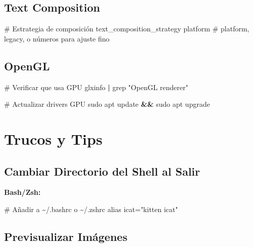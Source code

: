 \documentclass[
  doc,
  floatsintext,
  longtable,
  a4paper,
  nolmodern,
  notxfonts,
  notimes,
  12pt,
  colorlinks=true,linkcolor=blue,citecolor=blue,urlcolor=blue]{apa7}
\newenvironment{Shaded}{\begin{snugshade}}{\end{snugshade}}
\newcommand{\BuiltInTok}[1]{\textcolor[rgb]{0.00,0.23,0.31}{#1}}
\newcommand{\CommentTok}[1]{\textcolor[rgb]{0.37,0.37,0.37}{#1}}
\newcommand{\DataTypeTok}[1]{\textcolor[rgb]{0.68,0.00,0.00}{#1}}
\newcommand{\ExtensionTok}[1]{\textcolor[rgb]{0.00,0.23,0.31}{#1}}
\newcommand{\FunctionTok}[1]{\textcolor[rgb]{0.28,0.35,0.67}{#1}}
\newcommand{\KeywordTok}[1]{\textcolor[rgb]{0.00,0.23,0.31}{\textbf{#1}}}
\newcommand{\NormalTok}[1]{\textcolor[rgb]{0.00,0.23,0.31}{#1}}
\newcommand{\StringTok}[1]{\textcolor[rgb]{0.13,0.47,0.30}{#1}}
\begin{document}
\subsection{Text Composition}\label{text-composition}

\begin{Shaded}
\begin{Highlighting}[]
\CommentTok{\# Estrategia de composición}
\DataTypeTok{text\_composition\_strategy} \DataTypeTok{platform}
\CommentTok{\# platform, legacy, o números para ajuste fino}
\end{Highlighting}
\end{Shaded}

\subsection{OpenGL}\label{opengl}

\begin{Shaded}
\begin{Highlighting}[]
\CommentTok{\# Verificar que usa GPU}
\ExtensionTok{glxinfo} \KeywordTok{|} \FunctionTok{grep} \StringTok{"OpenGL renderer"}

\CommentTok{\# Actualizar drivers GPU}
\FunctionTok{sudo}\NormalTok{ apt update }\KeywordTok{\&\&} \FunctionTok{sudo}\NormalTok{ apt upgrade}
\end{Highlighting}
\end{Shaded}

\section{Trucos y Tips}\label{trucos-y-tips}

\subsection{Cambiar Directorio del Shell al
Salir}\label{cambiar-directorio-del-shell-al-salir}

\textbf{Bash/Zsh:}

\begin{Shaded}
\begin{Highlighting}[]
\CommentTok{\# Añadir a \textasciitilde{}/.bashrc o \textasciitilde{}/.zshrc}
\BuiltInTok{alias}\NormalTok{ icat=}\StringTok{"kitten icat"}
\end{Highlighting}
\end{Shaded}

\subsection{Previsualizar Imágenes}\label{previsualizar-imuxe1genes}
\end{document}
